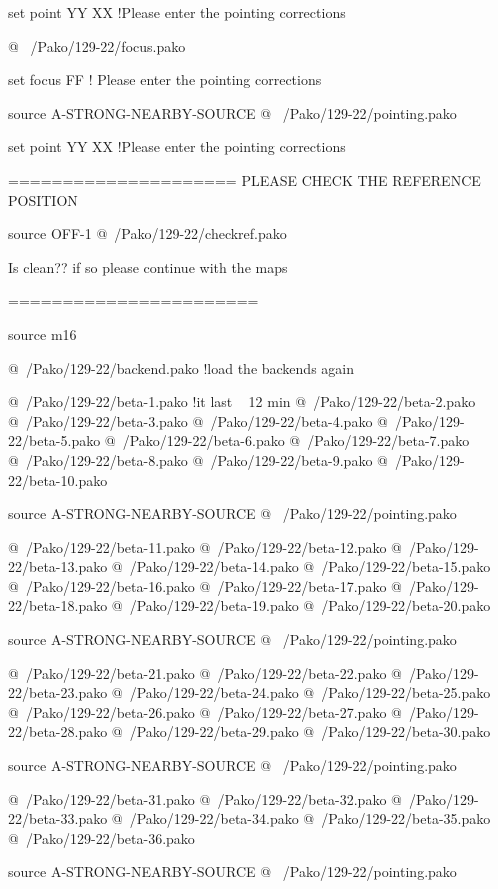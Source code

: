set point  YY XX     !Please enter the pointing corrections

@ ~/Pako/129-22/focus.pako

set focus FF   ! Please enter the pointing corrections


source A-STRONG-NEARBY-SOURCE
@ ~/Pako/129-22/pointing.pako
      
set point  YY XX     !Please enter the pointing corrections



=====================
PLEASE CHECK THE REFERENCE POSITION


source OFF-1
@~/Pako/129-22/checkref.pako

Is clean?? if so please continue with the maps

=======================


source m16

@~/Pako/129-22/backend.pako     !load the backends again 

@~/Pako/129-22/beta-1.pako        !it last ~ 12 min 
@~/Pako/129-22/beta-2.pako   
@~/Pako/129-22/beta-3.pako
@~/Pako/129-22/beta-4.pako
@~/Pako/129-22/beta-5.pako
@~/Pako/129-22/beta-6.pako
@~/Pako/129-22/beta-7.pako
@~/Pako/129-22/beta-8.pako
@~/Pako/129-22/beta-9.pako
@~/Pako/129-22/beta-10.pako

source A-STRONG-NEARBY-SOURCE
@ ~/Pako/129-22/pointing.pako

@~/Pako/129-22/beta-11.pako
@~/Pako/129-22/beta-12.pako
@~/Pako/129-22/beta-13.pako
@~/Pako/129-22/beta-14.pako
@~/Pako/129-22/beta-15.pako
@~/Pako/129-22/beta-16.pako
@~/Pako/129-22/beta-17.pako
@~/Pako/129-22/beta-18.pako
@~/Pako/129-22/beta-19.pako
@~/Pako/129-22/beta-20.pako

source A-STRONG-NEARBY-SOURCE
@ ~/Pako/129-22/pointing.pako

@~/Pako/129-22/beta-21.pako
@~/Pako/129-22/beta-22.pako
@~/Pako/129-22/beta-23.pako
@~/Pako/129-22/beta-24.pako
@~/Pako/129-22/beta-25.pako
@~/Pako/129-22/beta-26.pako
@~/Pako/129-22/beta-27.pako
@~/Pako/129-22/beta-28.pako
@~/Pako/129-22/beta-29.pako
@~/Pako/129-22/beta-30.pako

source A-STRONG-NEARBY-SOURCE
@ ~/Pako/129-22/pointing.pako

@~/Pako/129-22/beta-31.pako
@~/Pako/129-22/beta-32.pako
@~/Pako/129-22/beta-33.pako
@~/Pako/129-22/beta-34.pako
@~/Pako/129-22/beta-35.pako
@~/Pako/129-22/beta-36.pako

source A-STRONG-NEARBY-SOURCE
@ ~/Pako/129-22/pointing.pako

